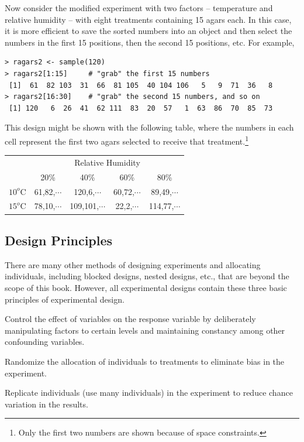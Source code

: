 \documentclass[10pt,openany]{book}\usepackage[]{graphicx}\usepackage[]{color}
\makeatletter
\newenvironment{kframe}{%
 \def\at@end@of@kframe{}%
 \ifinner\ifhmode%
  \def\at@end@of@kframe{\end{minipage}}%
  \begin{minipage}{\columnwidth}%
 \fi\fi%
 \def\FrameCommand##1{\hskip\@totalleftmargin \hskip-\fboxsep
 \colorbox{shadecolor}{##1}\hskip-\fboxsep
     \hskip-\linewidth \hskip-\@totalleftmargin \hskip\columnwidth}%
 \MakeFramed {\advance\hsize-\width
   \@totalleftmargin\z@ \linewidth\hsize
   \@setminipage}}%
 {\par\unskip\endMakeFramed%
 \at@end@of@kframe}
\newenvironment{knitrout}{}{} %
\makeatother
\begin{document}
Now consider the modified experiment with two factors -- temperature and relative humidity -- with eight treatments containing 15 agars each.  In this case, it is more efficient to save the sorted numbers into an object and then select the numbers in the first 15 positions, then the second 15 positions, etc.  For example,
\begin{knitrout}
\color{fgcolor}\begin{kframe}
\begin{verbatim}
> ragars2 <- sample(120)
> ragars2[1:15]     # "grab" the first 15 numbers
 [1]  61  82 103  31  66  81 105  40 104 106   5   9  71  36   8
> ragars2[16:30]    # "grab" the second 15 numbers, and so on
 [1] 120   6  26  41  62 111  83  20  57   1  63  86  70  85  73
\end{verbatim}
\end{kframe}
\end{knitrout}

This design might be shown with the following table, where the numbers in each cell represent the first two agars selected to receive that treatment.\footnote{Only the first two numbers are shown because of space constraints.}

\begin{center}
\begin{tabular}{cc|c|c|c}
 & \multicolumn{4}{c}{Relative Humidity} \\
\cline{2-5}
 & 20\% & 40\% & 60\% & 80\% \\
\cline{2-5}
\multicolumn{1}{c|}{$10^{o}$C} & 61,82,$\cdots$ & 120,6,$\cdots$ & 60,72,$\cdots$ & \multicolumn{1}{c|}{89,49,$\cdots$} \\
\hline
\multicolumn{1}{c|}{$15^{o}$C} & 78,10,$\cdots$ & 109,101,$\cdots$ & 22,2,$\cdots$ & \multicolumn{1}{c|}{114,77,$\cdots$} \\
\cline{2-5}
\end{tabular}
\end{center}



\subsection{Design Principles}
There are many other methods of designing experiments and allocating individuals, including blocked designs, nested designs, etc., that are beyond the scope of this book.  However, all experimental designs contain these three basic principles of experimental design.
\begin{Enumerate}
  \item Control the effect of variables on the response variable by deliberately manipulating factors to certain levels and maintaining constancy among other confounding variables.
  \item Randomize the allocation of individuals to treatments to eliminate bias in the experiment.
  \item Replicate individuals (use many individuals) in the experiment to reduce chance variation in the results.
\end{Enumerate}
\end{document}
